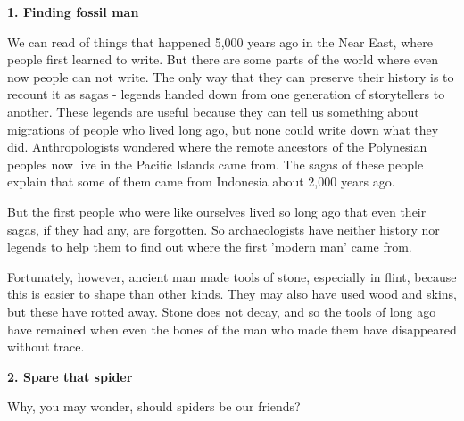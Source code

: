 \documentclass{report}
\begin{document}
\begin{center}\textbf{1. Finding fossil man}\end{center}
We can read of things that happened 5,000 years ago in the Near East, where
people first learned to write. But there are some parts of the world where even
now people can not write.  The only way that they can preserve their history is
to recount it as sagas - legends handed down from one generation of storytellers
to another. These legends are useful because they can tell us something about
migrations of people who lived long ago, but none could write down what they
did. Anthropologists wondered where the remote ancestors of the Polynesian
peoples now live in the Pacific Islands came from. The sagas of these people
explain that some of them came from Indonesia about 2,000 years ago.

But the first people who were like ourselves lived so long ago that even their
sagas, if they had any, are forgotten. So archaeologists have neither history
nor legends to help them to find out where the first 'modern man' came from.

Fortunately, however, ancient man made tools of stone, especially in flint,
because this is easier to shape than other kinds. They may also have used wood
and skins, but these have rotted away. Stone does not decay, and so the tools of
long ago have remained when even the bones of the man who made them have
disappeared without trace.

\clearpage
\begin{center}\textbf{2. Spare that spider}\end{center}
Why, you may wonder, should spiders be our friends?
\end{document}
